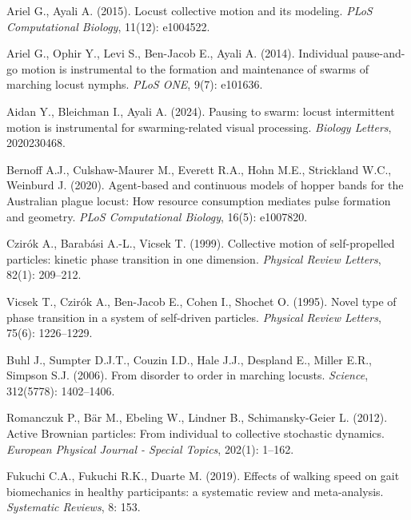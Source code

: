 \documentclass[11pt,a4paper]{article}
\begin{document}

\begin{thebibliography}{9}


Ariel G., Ayali A. (2015). Locust collective motion and its modeling. \emph{PLoS Computational Biology}, 11(12): e1004522.

Ariel G., Ophir Y., Levi S., Ben-Jacob E., Ayali A. (2014). Individual pause-and-go motion is instrumental to the formation and maintenance of swarms of marching locust nymphs. \emph{PLoS ONE}, 9(7): e101636.

Aidan Y., Bleichman I., Ayali A. (2024). Pausing to swarm: locust intermittent motion is instrumental for swarming-related visual processing. \emph{Biology Letters}, 2020230468.

Bernoff A.J., Culshaw-Maurer M., Everett R.A., Hohn M.E., Strickland W.C., Weinburd J. (2020). Agent-based and continuous models of hopper bands for the Australian plague locust: How resource consumption mediates pulse formation and geometry. \emph{PLoS Computational Biology}, 16(5): e1007820.

Czirók A., Barabási A.-L., Vicsek T. (1999). Collective motion of self-propelled particles: kinetic phase transition in one dimension. \emph{Physical Review Letters}, 82(1): 209–212.

Vicsek T., Czirók A., Ben-Jacob E., Cohen I., Shochet O. (1995). Novel type of phase transition in a system of self-driven particles. \emph{Physical Review Letters}, 75(6): 1226–1229.

Buhl J., Sumpter D.J.T., Couzin I.D., Hale J.J., Despland E., Miller E.R., Simpson S.J. (2006). From disorder to order in marching locusts. \emph{Science}, 312(5778): 1402–1406.

Romanczuk P., Bär M., Ebeling W., Lindner B., Schimansky-Geier L. (2012). Active Brownian particles: From individual to collective stochastic dynamics. \emph{European Physical Journal - Special Topics}, 202(1): 1–162.

Fukuchi C.A., Fukuchi R.K., Duarte M. (2019). Effects of walking speed on gait biomechanics in healthy participants: a systematic review and meta-analysis. \emph{Systematic Reviews}, 8: 153.


\end{thebibliography}
\end{document}
